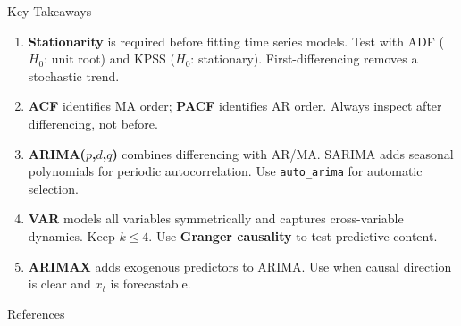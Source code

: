 \documentclass[aspectratio=169, 11pt]{beamer}
\begin{document}
\begin{frame}{Key Takeaways}
  \begin{keybox}
    {\small
    \begin{enumerate}
      \item \textbf{Stationarity} is required before fitting time series models.
            Test with ADF ($H_0$: unit root) and KPSS ($H_0$: stationary).
            First-differencing removes a stochastic trend.

      \item \textbf{ACF} identifies MA order; \textbf{PACF} identifies AR order.
            Always inspect after differencing, not before.

      \item \textbf{ARIMA($p$,$d$,$q$)} combines differencing with AR/MA.
            SARIMA adds seasonal polynomials for periodic autocorrelation.
            Use \texttt{auto\_arima} for automatic selection.

      \item \textbf{VAR} models all variables symmetrically and captures
            cross-variable dynamics. Keep $k \leq 4$.
            Use \textbf{Granger causality} to test predictive content.

      \item \textbf{ARIMAX} adds exogenous predictors to ARIMA.
            Use when causal direction is clear and $x_t$ is forecastable.
    \end{enumerate}
    }
  \end{keybox}
\end{frame}

\begin{frame}[allowframebreaks]{References}
  \printbibliography[heading=none]
\end{frame}

\end{document}
